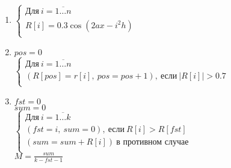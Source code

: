 \begin{enumerate}
    \item \(
    \begin{cases}
        \text{Для}\ i = \overline{1 \dots n}\\
        R[i] = 0.3\cos(2ax - i^2h)\\
    \end{cases}\)
    \item 
    \(pos = 0\)\\[0.2cm]
    \(\begin{cases}
        \text{Для}\ i = \overline{1 \dots n}\\
        (R[pos] = r[i],\ pos = pos + 1),\ \text{если}\ \vert R[i] \vert > 0.7\\
    \end{cases}\)
    \item 
    $fst = 0$\\
    $sum = 0$\\[0.2cm]
    $\begin{cases}
        \text{Для}\ i = \overline{1 \dots k}\\
        (fst = i,\ sum = 0),\ \text{если}\ R[i] > R[fst]\\
        (sum = sum + R[i])\ \text{в противном случае}\\    
    \end{cases}$\\
    \(\displaystyle M = \frac{sum}{k - fst - 1}\) 
\end{enumerate}